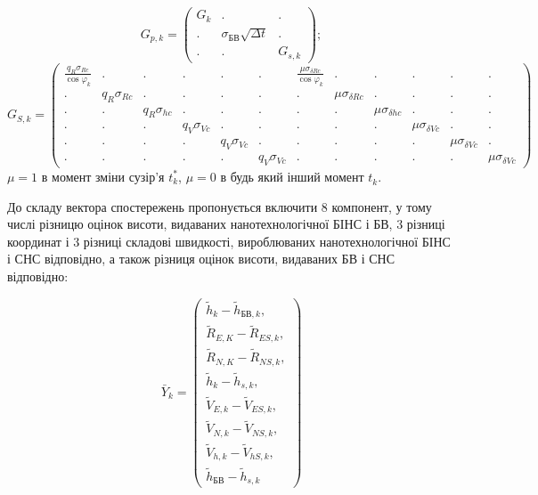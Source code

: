 \[G_{p,k} =\left(\begin{array}{ccc} 
{G_{k} } & {.} & {.} \\ 
{.} & {\sigma_{\text{БВ}} \sqrt{\Delta t}} & {.} \\ 
{.} & {.} & {G_{s,k} } \end{array}\right);\] 
\begin{equation*}
\scriptstyle
G_{S,k} = \left(\begin{array}{cccccccccccc} 
\scriptstyle{\frac{q_{R} \sigma_{Rc} }{\scriptstyle \cos \varphi_{k} } } & {.} & {.} & {.} & {.} & {.} & {\scriptstyle \frac{\mu \sigma_{\delta Rc} }{\cos \varphi_{k} } } & 
{.} & {.} & {.} & {.} & {.} \\ 
{.} & {\scriptstyle q_{R} \sigma_{Rc} } & {.} & {.} & {.} & {.} & {.} & {\scriptstyle \mu \sigma_{\delta Rc} } & {.} & {.} & {.} & {.} \\ 
{.} & {.} & {\scriptstyle q_{R} \sigma_{hc} } & {.} & {.} & {.} & {.} & {.} & {\scriptstyle \mu \sigma_{\delta hc} } & {.} & {.} & {.} \\ 
{.} & {.} & {.} & {\scriptstyle q_{V} \sigma_{Vc} } & {.} & {.} & {.} & {.} & {.} & {\scriptstyle \mu \sigma_{\delta Vc} } & {.} & {.} \\ 
{.} & {.} & {.} & {.} & {\scriptstyle q_{V} \sigma_{Vc} } & {.} & {.} & {.} & {.} & {.} & {\scriptstyle \mu \sigma_{\delta Vc} } & {.} \\ 
\scriptstyle{.} & {.} & {.} & {.} & {.} & {\scriptstyle q_{V} \sigma_{Vc} } & {.} & {.} & {.} & {.} & {.} & {\scriptstyle \mu \sigma_{\delta Vc} } \end{array}\right)
\end{equation*}
$\mu =1$ в момент зміни сузір'я $t_{k}^{*} $, $\mu =0$ в будь який інший момент $t_{k}^{} $.

До 
складу вектора спостережень  пропонується включити 8 компонент, у тому числі різницю 
оцінок висоти, видаваних  нанотехнологічної БІНС   і БВ, 3 різниці координат і 3 
різниці складові швидкості, вироблюваних нанотехнологічної БІНС і СНС відповідно, 
а також різниця оцінок висоти, видаваних БВ і СНС відповідно:

\begin{equation} 
\label{eq:measure_vector} 
\bar{Y}_{k} = 
\left(\begin{array}{l}
{\tilde{h}_{k} -\tilde{h}_{\text{БВ},k},}\\
{\tilde{R}_{E,K} -\tilde{R}_{ES,k},}\\
{\tilde{R}_{N,K} -\tilde{R}_{NS,k},}\\
{\tilde{h}_{k} -\tilde{h}_{s,k},}\\
{\tilde{V}_{E,k} -\tilde{V}_{ES,k},}\\
{\tilde{V}_{N,k} -\tilde{V}_{NS,k},}\\
{\tilde{V}_{h,k} -\tilde{V}_{hS,k},}\\
{\tilde{h}_{\text{БВ}} -\tilde{h}_{s,k}}
\end{array} \right)  
\end{equation} 

